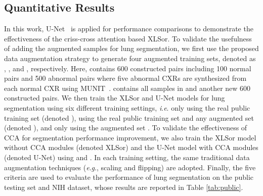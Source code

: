 \documentclass{midl} \usepackage{multirow}
\newcommand{\ie}{\textit{i}.\textit{e}. }
\newcommand{\eg}{\textit{e}.\textit{g}., }
\begin{document}
\subsection{Quantitative Results}
In this work, U-Net~\cite{U-net} is applied for performance comparisons to demonstrate the effectiveness of the criss-cross attention based XLSor. 
To validate the usefulness of adding the augmented samples for lung segmentation, we first use the proposed data augmentation strategy to generate four augmented training sets, denoted as , ,  and , respectively. Here,  contains 600 constructed pairs including 100 normal pairs and 500 abnormal pairs where five abnormal CXRs are synthesized from each normal CXR using MUNIT~\cite{munit}.   contains all samples in  and another new 600 constructed pairs.
We then train the XLSor and U-Net models for lung segmentation using six different training settings, \ie only using the real public training set (denoted ), using the real public training set and any augmented set   (denoted ), and only using the augmented set . 
To validate the effectiveness of CCA for segmentation performance improvement, we also train the XLSor model without CCA modules (denoted XLSor) and the U-Net model with CCA modules (denoted U-Net) using  and .
In each training setting, the same traditional data augmentation techniques (\eg scaling and flipping) are adopted. Finally, the five criteria are used to evaluate the performance of lung segmentation on the public testing set and NIH dataset, whose results are reported in Table \ref{tab:public}.
\end{document}
